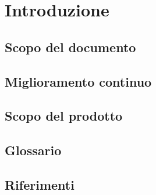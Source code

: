 \chapter{Introduzione}

\section{Scopo del documento}

\section{Miglioramento continuo}

\section{Scopo del prodotto}

\section{Glossario}

\section{Riferimenti}
